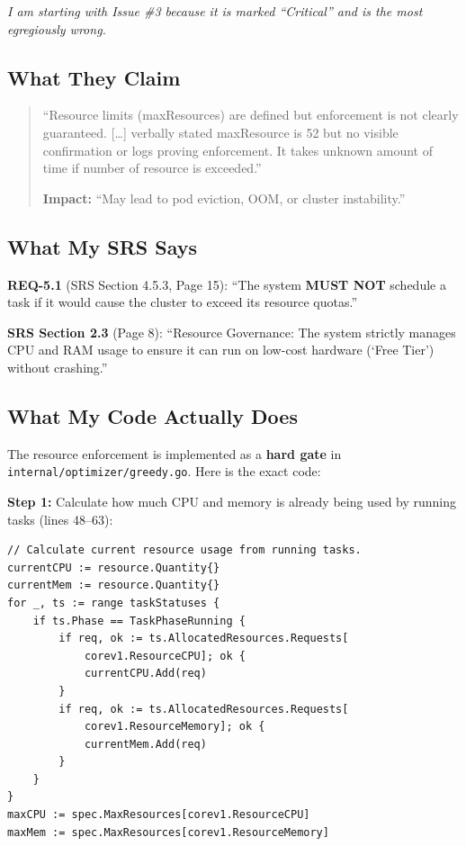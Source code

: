 \documentclass[12pt,a4paper]{article}
\begin{document}
\textit{I am starting with Issue \#3 because it is marked ``Critical'' and is the most egregiously wrong.}

\subsection{What They Claim}

\begin{quote}
``Resource limits (maxResources) are defined but enforcement is not clearly guaranteed. [\ldots] verbally stated maxResource is 52 but no visible confirmation or logs proving enforcement. It takes unknown amount of time if number of resource is exceeded.''

\textbf{Impact:} ``May lead to pod eviction, OOM, or cluster instability.''
\end{quote}

\subsection{What My SRS Says}

\begin{srsbox}
\textbf{REQ-5.1} (SRS Section 4.5.3, Page 15): ``The system \textbf{MUST NOT} schedule a task if it would cause the cluster to exceed its resource quotas.''

\textbf{SRS Section 2.3} (Page 8): ``Resource Governance: The system strictly manages CPU and RAM usage to ensure it can run on low-cost hardware (`Free Tier') without crashing.''
\end{srsbox}

\subsection{What My Code Actually Does}

\begin{codebox}
The resource enforcement is implemented as a \textbf{hard gate} in \texttt{internal/optimizer/greedy.go}. Here is the exact code:
\end{codebox}

\textbf{Step 1:} Calculate how much CPU and memory is already being used by running tasks (lines 48--63):

\begin{lstlisting}
// Calculate current resource usage from running tasks.
currentCPU := resource.Quantity{}
currentMem := resource.Quantity{}
for _, ts := range taskStatuses {
    if ts.Phase == TaskPhaseRunning {
        if req, ok := ts.AllocatedResources.Requests[
            corev1.ResourceCPU]; ok {
            currentCPU.Add(req)
        }
        if req, ok := ts.AllocatedResources.Requests[
            corev1.ResourceMemory]; ok {
            currentMem.Add(req)
        }
    }
}
maxCPU := spec.MaxResources[corev1.ResourceCPU]
maxMem := spec.MaxResources[corev1.ResourceMemory]
\end{lstlisting}
\end{document}
